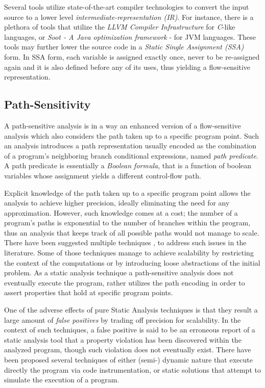 Several tools utilize state-of-the-art compiler technologies to
convert the input source to a lower level \emph{intermediate-representation (IR)}.
For instance, there is a plethora of tools that utilize the \emph{LLVM Compiler 
Infrastructure}\cite{llvm-lattner} for \emph{C}-like languages,
or \emph{Soot - A Java optimization framework}\cite{soot} - for JVM languages.
These tools may further lower the source code in a
\emph{Static Single Assignment (SSA)} form. In SSA form, each variable is
assigned exactly once, never to be re-assigned again and it is also defined
before any of its uses, thus yielding a flow-sensitive representation.

\subsection{Path-Sensitivity}

A path-sensitive analysis is in a way an enhanced version of a
flow-sensitive analysis which also considers the path taken up to
a specific program point. Such an analysis
introduces a path representation usually encoded as the combination of
a program's neighboring branch conditional expressions,
named \textit{path predicate}. A path predicate is essentially a
\textit{Boolean formula}, that is a function of boolean variables whose assignment yields a
different control-flow path.

Explicit knowledge of the path taken up to a specific
program point allows the analysis to achieve higher
precision, ideally eliminating the need for any approximation.
However, such knowledge comes at a cost; the number of a program's
paths is exponential to the number of branches within the program,
thus an analysis that keeps track of all possible paths would not
manage to scale. There have been suggested multiple techniques
\cite{dillig2008sound}, \cite{das2002esp} to address such issues
in the literature. Some of those techniques manage to achieve
scalability by restricting the context of the computations or
by introducing loose abstractions of the initial problem.
As a static analysis technique a path-sensitive analysis does not
eventually execute the program, rather utilizes
the path encoding in order to assert properties that hold at
specific program points.

One of the adverse effects of pure Static Analysis techniques
is that they result a large amount of \textit{false positives} by
trading off precision for scalability. In the context of
such techniques, a false positive is said to be an erroneous report
of a static analysis tool that a property violation has been
discovered within the analyzed program, though such violation
does not eventually exist. There have been
proposed several techniques of either (semi-) dynamic nature
that execute directly the program via code instrumentation, or
static solutions that attempt to simulate the execution of a program.

